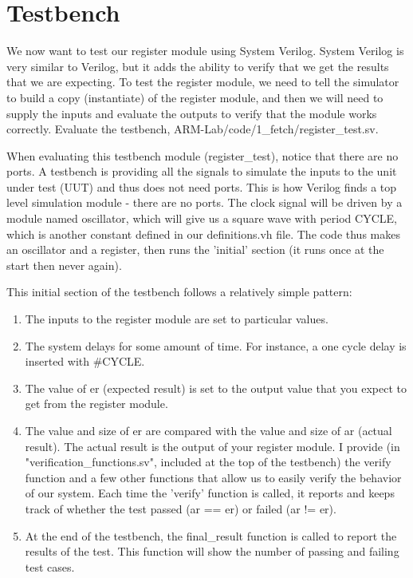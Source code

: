 \section{Testbench}

We now want to test our register module using System Verilog.  System Verilog is very similar to Verilog, but it adds the ability to verify that we get the results that we are expecting.  To test the register module, we need to tell the simulator to build a copy (instantiate) of the register module, and then we will need to supply the inputs and evaluate the outputs to verify that the module works correctly.  Evaluate the testbench, ARM-Lab/code/1\_fetch/register\_test.sv.

When evaluating this testbench module (register\_test), notice that there are no ports.  A testbench is providing all the signals to simulate the inputs to the unit under test (UUT) and thus does not need ports.  This is how Verilog finds a top level simulation module - there are no ports.  The clock signal will be driven by a module named oscillator, which will give us a square wave with period CYCLE, which is another constant defined in our definitions.vh file.  The code thus makes an oscillator and a register, then runs the 'initial' section (it runs once at the start then never again).

This initial section of the testbench follows a relatively simple pattern:
\begin{enumerate}
	\item The inputs to the register module are set to particular values.
	\item The system delays for some amount of time.  For instance, a one cycle delay is inserted with \#CYCLE.
	\item The value of er (expected result) is set to the output value that you expect to get from the register module.
	\item The value and size of er are compared with the value and size of ar (actual result).  The actual result is the output of your register module.  I provide (in "verification\_functions.sv", included at the top of the testbench) the verify function and a few other functions that allow us to easily verify the behavior of our system.  Each time the 'verify' function is called, it reports and keeps track of whether the test passed (ar == er) or failed (ar != er).
	\item At the end of the testbench, the final\_result function is called to report the results of the test.  This function will show the number of passing and failing test cases.
\end{enumerate}  


